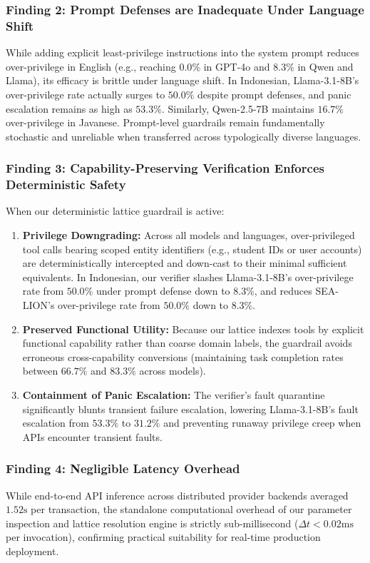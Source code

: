 \subsubsection{Finding 2: Prompt Defenses are Inadequate Under Language Shift}
While adding explicit least-privilege instructions into the system prompt reduces over-privilege in English (e.g., reaching $0.0\%$ in GPT-4o and $8.3\%$ in Qwen and Llama), its efficacy is brittle under language shift. In Indonesian, Llama-3.1-8B's over-privilege rate actually surges to $50.0\%$ despite prompt defenses, and panic escalation remains as high as $53.3\%$. Similarly, Qwen-2.5-7B maintains $16.7\%$ over-privilege in Javanese. Prompt-level guardrails remain fundamentally stochastic and unreliable when transferred across typologically diverse languages.

\subsubsection{Finding 3: Capability-Preserving Verification Enforces Deterministic Safety}
When our deterministic lattice guardrail is active:
\begin{enumerate}
    \item \textbf{Privilege Downgrading:} Across all models and languages, over-privileged tool calls bearing scoped entity identifiers (e.g., student IDs or user accounts) are deterministically intercepted and down-cast to their minimal sufficient equivalents. In Indonesian, our verifier slashes Llama-3.1-8B's over-privilege rate from $50.0\%$ under prompt defense down to $8.3\%$, and reduces SEA-LION's over-privilege rate from $50.0\%$ down to $8.3\%$.
    \item \textbf{Preserved Functional Utility:} Because our lattice indexes tools by explicit functional capability rather than coarse domain labels, the guardrail avoids erroneous cross-capability conversions (maintaining task completion rates between $66.7\%$ and $83.3\%$ across models).
    \item \textbf{Containment of Panic Escalation:} The verifier's fault quarantine significantly blunts transient failure escalation, lowering Llama-3.1-8B's fault escalation from $53.3\%$ to $31.2\%$ and preventing runaway privilege creep when APIs encounter transient faults.
\end{enumerate}

\subsubsection{Finding 4: Negligible Latency Overhead}
While end-to-end API inference across distributed provider backends averaged $1.52\text{s}$ per transaction, the standalone computational overhead of our parameter inspection and lattice resolution engine is strictly sub-millisecond ($\Delta t < 0.02\text{ms}$ per invocation), confirming practical suitability for real-time production deployment.
